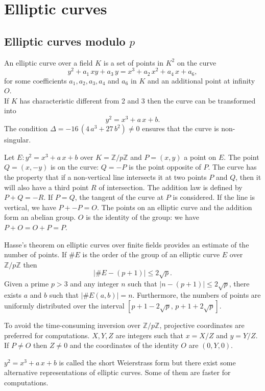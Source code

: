 \documentclass[a4paper, 11pt, pdftex]{report}
\theoremstyle{plain}
\theoremstyle{definition}
\begin{document}
\chapter{Elliptic curves}

\section{Elliptic curves modulo $p$}

An elliptic curve over a field $K$ is a set of points in $K^2$ on the curve
$$y^2 + a_1\, x y + a_3\, y = x^3 + a_2\, x^2 + a_4\, x + a_6,$$
for some coefficients $a_1, a_2, a_3, a_4$ and $a_6$ in $K$ and an additional point at infinity $O$.\\
If $K$ has characteristic different from 2 and 3 then the curve can be transformed into
$$y^2 = x^3 + a\,x + b.$$
The condition $\Delta = -16\,(4\,a^3 + 27\,b^2) \neq 0$ ensures that the curve is non-singular.

Let $E: y^2 = x^3 + a\,x + b$ over $K = \mathbb{Z}/p\mathbb{Z}$ and $P = (x, y)$
a point on $E$. The point $Q = (x, -y)$ is on the curve: $Q = -P$ is the point opposite of $P$.
The curve has the property that if a non-vertical line intersects it at two points $P$ and $Q$,
then it will also have a third point $R$ of intersection. The addition law is defined
by $P + Q = -R$. If $P = Q$, the tangent of the curve at $P$ is considered.
If the line is vertical, we have $P + -P = O$.
The points on an elliptic curve and the addition form an abelian group.
$O$ is the identity of the group: we have $P + O = O + P = P$.

Hasse's theorem on elliptic curves over finite fields provides an estimate of the number of
points. If $\#E$ is the order of the group of an elliptic curve $E$ over $\mathbb{Z}/p\mathbb{Z}$
then
$$|\#E - (p + 1) | \le 2\sqrt{p}.$$
Given a prime $p > 3$ and any integer $n$ such that $|n - (p + 1)| \le 2\sqrt{p}$, there exists
$a$ and $b$ such that $|\#E(a, b)| = n$. Furthermore, the numbers of points are uniformly
distributed over the interval $[p + 1 - 2\sqrt{p},\, p + 1 + 2\sqrt{p}]$.

To avoid the time-consuming inversion over $\mathbb{Z}/p\mathbb{Z}$, projective coordinates
are preferred for computations. $X, Y, Z$ are integers such that $x = X/Z$ and $y = Y/Z$.
If $P \neq O$ then $Z \neq 0$ and the coordinates of the identity $O$ are $(0, Y, 0)$.

$y^2 = x^3 + a\,x + b$ is called the short Weierstrass form but there exist
some alternative representations of elliptic curves. Some of them are faster for computations.
\end{document}
